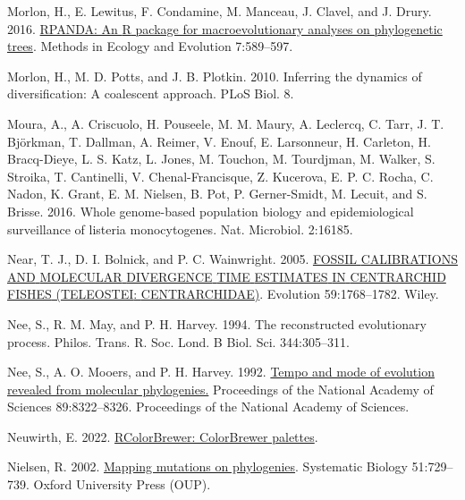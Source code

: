 \documentclass[fleqn,10pt,lineno]{wlpeerj} %
\newlength{\cslhangindent}
\newlength{\cslentryspacingunit} %
\newenvironment{CSLReferences}[2] %
 {%
  \setlength{\parindent}{0pt}
  \ifodd #1
  \let\oldpar\par
  \def\par{\hangindent=\cslhangindent\oldpar}
  \fi
  \setlength{\parskip}{#2\cslentryspacingunit}
 }%
 {}
\begin{document}
\begin{CSLReferences}{1}{0}
\leavevmode{}%
Morlon, H., E. Lewitus, F. Condamine, M. Manceau, J. Clavel, and J. Drury. 2016. \href{https://CRAN.R-project.org/package=RPANDA}{RPANDA: An {R} package for macroevolutionary analyses on phylogenetic trees}. Methods in Ecology and Evolution 7:589--597.

\leavevmode{}%
Morlon, H., M. D. Potts, and J. B. Plotkin. 2010. Inferring the dynamics of diversification: A coalescent approach. PLoS Biol. 8.

\leavevmode{}%
Moura, A., A. Criscuolo, H. Pouseele, M. M. Maury, A. Leclercq, C. Tarr, J. T. Björkman, T. Dallman, A. Reimer, V. Enouf, E. Larsonneur, H. Carleton, H. Bracq-Dieye, L. S. Katz, L. Jones, M. Touchon, M. Tourdjman, M. Walker, S. Stroika, T. Cantinelli, V. Chenal-Francisque, Z. Kucerova, E. P. C. Rocha, C. Nadon, K. Grant, E. M. Nielsen, B. Pot, P. Gerner-Smidt, M. Lecuit, and S. Brisse. 2016. Whole genome-based population biology and epidemiological surveillance of listeria monocytogenes. Nat. Microbiol. 2:16185.

\leavevmode{}%
Near, T. J., D. I. Bolnick, and P. C. Wainwright. 2005. \href{https://doi.org/10.1111/j.0014-3820.2005.tb01825.x}{{FOSSIL} {CALIBRATIONS} {AND} {MOLECULAR} {DIVERGENCE} {TIME} {ESTIMATES} {IN} {CENTRARCHID} {FISHES} ({TELEOSTEI}: {CENTRARCHIDAE})}. Evolution 59:1768--1782. Wiley.

\leavevmode{}%
Nee, S., R. M. May, and P. H. Harvey. 1994. The reconstructed evolutionary process. Philos. Trans. R. Soc. Lond. B Biol. Sci. 344:305--311.

\leavevmode{}%
Nee, S., A. O. Mooers, and P. H. Harvey. 1992. \href{https://doi.org/10.1073/pnas.89.17.8322}{Tempo and mode of evolution revealed from molecular phylogenies.} Proceedings of the National Academy of Sciences 89:8322--8326. Proceedings of the National Academy of Sciences.

\leavevmode{}%
Neuwirth, E. 2022. \href{https://CRAN.R-project.org/package=RColorBrewer}{RColorBrewer: ColorBrewer palettes}.

\leavevmode{}%
Nielsen, R. 2002. \href{https://doi.org/10.1080/10635150290102393}{Mapping mutations on phylogenies}. Systematic Biology 51:729--739. Oxford University Press ({OUP}).


\end{CSLReferences}
\end{document}
